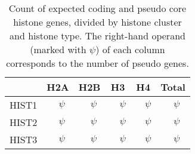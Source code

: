 
    \begin{table*}
      \caption{Count of expected coding and pseudo core histone genes,
               divided by histone cluster and histone type. The right-hand
               operand (marked with $\psi$) of each column corresponds to the
               number of pseudo genes.}
      \label{tab:histone-gene-count}
      \centering
      \begin{tabular}{l r@{ + }l<{$\psi$} r@{ + }l<{$\psi$} r@{ + }l<{$\psi$} r@{ + }l<{$\psi$} r@{ + }l<{$\psi$}}
        \toprule
        \null   & \multicolumn{2}{c}{H2A}  & \multicolumn{2}{c}{H2B}
                & \multicolumn{2}{c}{H3}   & \multicolumn{2}{c}{H4}
                & \multicolumn{2}{c}{Total} \\
        \midrule
        HIST1   & \HTwoACodingInHISTOne{}     & \HTwoAPseudoInHISTOne{}
                & \HTwoBCodingInHISTOne{}     & \HTwoBPseudoInHISTOne{}
                & \HThreeCodingInHISTOne{}    & \HThreePseudoInHISTOne{}
                & \HFourCodingInHISTOne{}     & \HFourPseudoInHISTOne{}
                & \CodingGenesInHISTOne{}     & \PseudoGenesInHISTOne{} \\
        HIST2   & \HTwoACodingInHISTTwo{}     & \HTwoAPseudoInHISTTwo{}
                & \HTwoBCodingInHISTTwo{}     & \HTwoBPseudoInHISTTwo{}
                & \HThreeCodingInHISTTwo{}    & \HThreePseudoInHISTTwo{}
                & \HFourCodingInHISTTwo{}     & \HFourPseudoInHISTTwo{}
                & \CodingGenesInHISTTwo{}     & \PseudoGenesInHISTTwo{} \\
        HIST3   & \HTwoACodingInHISTThree{}   & \HTwoAPseudoInHISTThree{}
                & \HTwoBCodingInHISTThree{}   & \HTwoBPseudoInHISTThree{}
                & \HThreeCodingInHISTThree{}  & \HThreePseudoInHISTThree{}
                & \HFourCodingInHISTThree{}   & \HFourPseudoInHISTThree{}
                & \CodingGenesInHISTThree{}   & \PseudoGenesInHISTThree{} \\

\end{tabular}
\end{table*}
